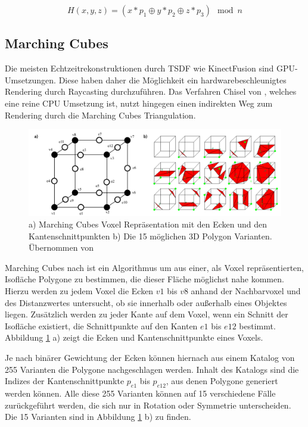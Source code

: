 \begin{equation}\label{eq:spatial_hash}
H(x,y,z) = (x * p_1 \oplus y * p_2 \oplus z * p_3) \mod n
\end{equation}

\subsection{Marching Cubes}

Die meisten Echtzeitrekonstruktionen durch TSDF wie KinectFusion sind GPU-Umsetzungen. Diese haben daher die Möglichkeit ein hardwarebeschleunigtes Rendering durch Raycasting durchzuführen. Das Verfahren Chisel von \citet{Klingensmith_2015_7924}, welches eine reine CPU Umsetzung ist, nutzt hingegen einen indirekten Weg zum Rendering durch die Marching Cubes Triangulation. 

\begin{figure}[h]
  \centering
	\includegraphics[width=1.0\textwidth]{content/images/methods/marchingcubes.png} 
  \caption{a) Marching Cubes Voxel Repräsentation mit den Ecken und den Kantenschnittpunkten b) Die 15 möglichen 3D Polygon Varianten. Übernommen von \citet{MarchingCubes:online}}
  \label{fig:marchingcubes}
\end{figure}

Marching Cubes nach \citet{lorensen1987marching} ist ein Algorithmus um aus einer, als Voxel repräsentierten, Isofläche Polygone zu bestimmen, die dieser Fläche möglichst nahe kommen. Hierzu werden zu jedem Voxel die Ecken \(v1\) bis \(v8\) anhand der Nachbarvoxel und des Distanzwertes untersucht, ob sie innerhalb oder außerhalb eines Objektes liegen. Zusätzlich werden zu jeder Kante auf dem Voxel, wenn ein Schnitt der Isofläche existiert, die Schnittpunkte auf den Kanten \(e1\) bis \(e12\) bestimmt. Abbildung \ref{fig:marchingcubes} a) zeigt die Ecken und Kantenschnittpunkte eines Voxels. 

Je nach binärer Gewichtung der Ecken können hiernach aus einem Katalog von 255 Varianten die Polygone nachgeschlagen werden. Inhalt des Katalogs sind die Indizes der Kantenschnittpunkte \(p_{e1}\) bis \(p_{e12}\), aus denen Polygone generiert werden können. Alle diese 255 Varianten können auf 15 verschiedene Fälle zurückgeführt werden, die sich nur in Rotation oder Symmetrie unterscheiden. Die 15 Varianten sind in Abbildung \ref{fig:marchingcubes} b) zu finden. \citep{MarchingCubes:online} 

